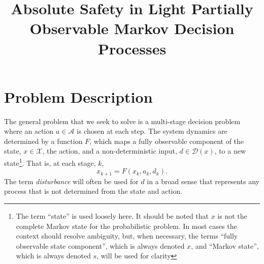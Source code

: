 \documentclass{article}
\title{Absolute Safety in Light Partially Observable Markov Decision Processes}
\newcommand{\aspace}{\ensuremath{\mathcal{A}} }
\newcommand{\dset}{\mathcal{D}}
\begin{document}
\maketitle

% 
% 
% 

\section{Problem Description}


The general problem that we seek to solve is a multi-stage decision problem where an action $a \in \aspace$ is chosen at each step.
The system dynamics are determined by a function $F$, which maps a fully observable component of the state, $x \in \mathcal{X}$, the action, and a non-deterministic input, $d \in \dset(x)$, to a new state\footnote{The term ``state'' is used loosely here. It should be noted that $x$ is not the complete Markov state for the probabilistic problem. In most cases the context should resolve ambiguity, but, when necessary, the terms ``fully observable state component'', which is always denoted $x$, and ``Markov state'', which is always denoted $s$, will be used for clarity}.
That is, at each stage, $k$,
\begin{equation}
    x_{k+1} = F(x_k, a_k, d_k) \text{.}
\end{equation}
The term \emph{disturbance} will often be used for $d$ in a broad sense that represents any process that is not determined from the state and action.
\end{document}

